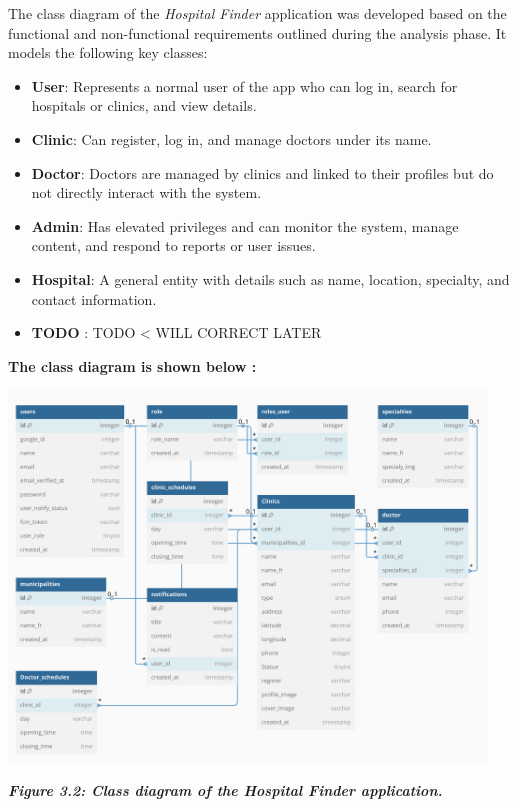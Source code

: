 \documentclass[12pt]{report}
\begin{document}
The class diagram of the \textit{Hospital Finder} application was developed based on the functional and non-functional requirements outlined during the analysis phase. It models the following key classes:

\begin{itemize}

	\item \textbf{User}: Represents a normal user of the app who can log in, search for hospitals or clinics, and view details.
	\item \textbf{Clinic}: Can register, log in, and manage doctors under its name.
	\item \textbf{Doctor}: Doctors are managed by clinics and linked to their profiles but do not directly interact with the system.
	\item \textbf{Admin}: Has elevated privileges and can monitor the system, manage content, and respond to reports or user issues.
	\item \textbf{Hospital}: A general entity with details such as name, location, specialty, and contact information.
	\item \textbf{TODO }: TODO < WILL CORRECT LATER
\end{itemize}

\textbf{ The class diagram is shown below : }

\begin{center}
	\includegraphics[width=0.95\textwidth]{images/dbclass.pdf}
\end{center}

\begin{center}
	\textit{\textbf{ Figure 3.2: Class diagram of the Hospital Finder application.}}
\end{center}
\vspace{0.5cm}
\end{document}
